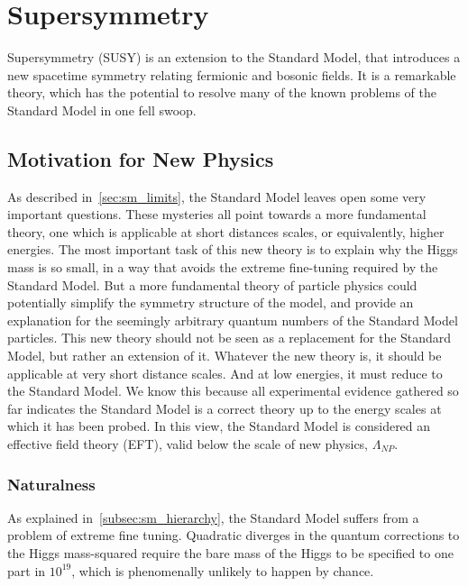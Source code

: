 \chapter{Supersymmetry} \label{ch:susy}

Supersymmetry (SUSY) is an extension to the Standard Model, that introduces a new spacetime symmetry relating fermionic and bosonic fields.
It is a remarkable theory, which has the potential to resolve many of the known problems of the Standard Model in one fell swoop.

\section{Motivation for New Physics}\label{sec:susy_motivation}

As described in~\ref{sec:sm_limits}, the Standard Model leaves open some very important questions.
These mysteries all point towards a more fundamental theory, one which is applicable at short distances scales,
or equivalently, higher energies.
The most important task of this new theory is to explain why the Higgs mass is so small,
in a way that avoids the extreme fine-tuning required by the Standard Model.
But a more fundamental theory of particle physics could potentially simplify the symmetry structure of the model,
and provide an explanation for the seemingly arbitrary quantum numbers of the Standard Model particles.
This new theory should not be seen as a replacement for the Standard Model, but rather an extension of it.
Whatever the new theory is, it should be applicable at very short distance scales.
And at low energies, it must reduce to the Standard Model.
We know this because all experimental evidence gathered so far indicates the Standard Model is a correct theory
up to the energy scales at which it has been probed.
In this view, the Standard Model is considered an effective field theory (EFT),
valid below the scale of new physics, $\Lambda_{NP}$.

\subsection{Naturalness}\label{subsec:susy_naturalness}

As explained in~\ref{subsec:sm_hierarchy}, the Standard Model suffers from a problem of extreme fine tuning.
Quadratic diverges in the quantum corrections to the Higgs mass-squared require the bare mass of the Higgs to be
specified to one part in $10^{19}$, which is phenomenally unlikely to happen by chance.

